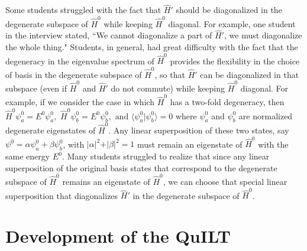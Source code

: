 \documentclass[aps,pra,showpacs,showkeys,twocolumn,groupedaddress]{revtex4-1}
\begin{document}
Some students struggled with the fact that $\hat{H}'$ should be diagonalized in the degenerate subspace of $\hat{H}^0$ while keeping $\hat{H}^0$ diagonal.  For example, one student in the interview stated, ``We cannot diagonalize a part of $\hat{H}'$, we must diagonalize the whole thing."  Students, in general, had great difficulty with the fact that the degeneracy in the eigenvalue spectrum of $\hat{H}^0$ provides the flexibility in the choice of basis in the degenerate subspace of $\hat{H}^0$, so that $\hat{H}'$ can be diagonalized in that subspace (even if $\hat{H}^0$ and $\hat{H}'$ do not commute) while keeping $\hat{H}^0$ diagonal.  For example, if we consider the case in which $\hat{H}^0$ has a two-fold degeneracy, then
\mbox{$\hat{H}^0 \psi_a^0 = E^0 \psi_a^0,  \,\,\hat{H}^0 \psi_b^0 = E^0 \psi_b^0, \,\, \textrm{and} \,\, \langle \psi_a^0|\psi_b^0 \rangle =0$}
where $\psi_a^0$ and $\psi_b^0$ are normalized degenerate eigenstates of $\hat{H}^0$.  Any linear superposition of these two states, say $\psi^0 = \alpha \psi_a^0 + \beta \psi_b^0$, with $\vert \alpha \vert^2+\vert \beta \vert^2=1$ must remain an eigenstate of $\hat{H}^0$ with the same energy $E^0$.  
Many students struggled to realize that since any linear superposition of the original basis states that correspond to the degenerate subspace of $\hat{H}^0$ remains an eigenstate of $\hat{H}^0$, we can choose that special linear superposition that diagonalizes $\hat{H}'$ in the degenerate subspace of $\hat{H}^0$.  


\vspace*{-.19in}
\section{Development of the QuILT}
\vspace*{-.11in}
\end{document}
